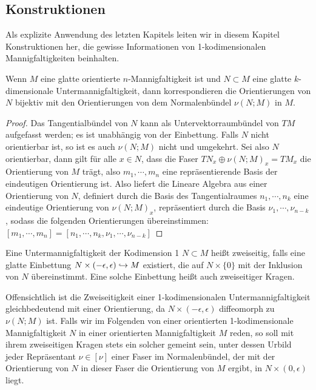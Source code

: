 	\subsection{Konstruktionen}
	Als explizite Anwendung des letzten Kapitels leiten wir in diesem Kapitel Konstruktionen her, die gewisse Informationen von 1-kodimensionalen Mannigfaltigkeiten beinhalten.
	\begin{lem}
		Wenn $M$ eine glatte orientierte $n$-Mannigfaltigkeit ist und $N\subset M$ eine glatte $k$-dimensionale Untermannigfaltigkeit, dann korrespondieren die Orientierungen von $N$ bijektiv mit den Orientierungen von dem Normalenbündel $\nu (N;M)$ in $M$.
	\end{lem}
	\begin{proof}
		Das Tangentialbündel von $N$ kann als Untervektorraumbündel von $TM$ aufgefasst werden; es ist unabhängig von der Einbettung. Falls $N$ nicht orientierbar ist, so ist es auch $\nu(N;M)$ nicht und umgekehrt. Sei also $N$ orientierbar, dann gilt für alle $x \in N$, dass die Faser $TN_x\oplus \nu(N;M)_x = TM_x$ die Orientierung von $M$ trägt, also $m_1,\cdots,m_n$ eine repräsentierende Basis der eindeutigen Orientierung ist. Also liefert die Lineare Algebra aus einer Orientierung von $N$, definiert durch die Basis des Tangentialraumes $n_1,\cdots,n_k$ eine eindeutige Orientierung von $\nu(N;M)_x$, repräsentiert durch die Basis $\nu_1,\cdots,\nu_{n-k}$, sodass die folgenden Orientierungen übereinstimmen: $[m_1,\cdots,m_n] = [n_1,\cdots,n_k,\nu_1,\cdots,\nu_{n-k}] $
	\end{proof}

	\begin{defn}
		Eine Untermannigfaltigkeit der Kodimension 1 $N\subset M$ heißt zweiseitig, falls eine glatte Einbettung $N \times (-\epsilon,\epsilon) \hookrightarrow M$ existiert, die auf $N \times \{0\} $ mit der Inklusion von $N$ übereinstimmt. Eine solche Einbettung heißt auch zweiseitiger Kragen.
	\end{defn}
	\begin{bem}
	\label{bem:zweiseitigkeit}
		Offensichtlich ist die Zweiseitigkeit einer 1-kodimensionalen Untermannigfaltigkeit gleichbedeutend mit einer Orientierung, da $N \times (-\epsilon,\epsilon)$ diffeomorph zu $\nu(N;M)$ ist. Falls wir im Folgenden von einer orientierten 1-kodimensionale Mannigfaltigkeit $N$ in einer orientierten Mannigfaltigkeit $M$ reden, so soll mit ihrem zweiseitigen Kragen stets ein solcher gemeint sein, unter dessen Urbild jeder Repräsentant $\nu \in [\nu]$ einer Faser im Normalenbündel, der mit der Orientierung von $N$ in dieser Faser die Orientierung von $M$ ergibt, in $N\times (0,\epsilon)$ liegt.
	\end{bem}

